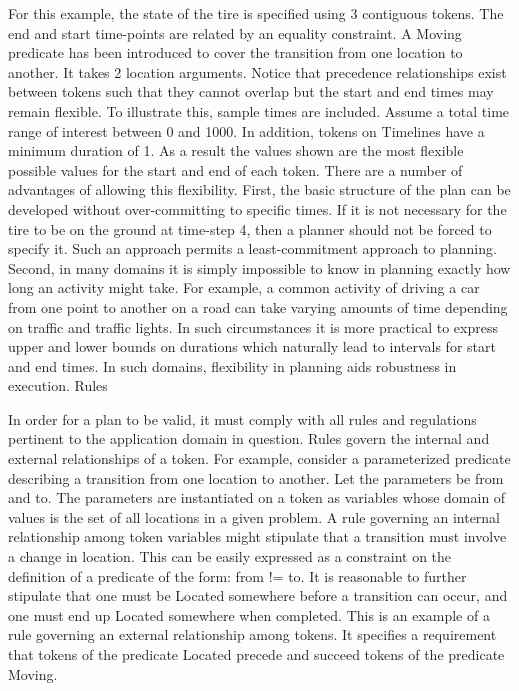 For this example, the state of the tire is specified using 3 contiguous tokens. The end and start time-points are related by an equality constraint. A Moving predicate has been introduced to cover the transition from one location to another. It takes 2 location arguments. Notice that precedence relationships exist between tokens such that they cannot overlap but the start and end times may remain flexible. To illustrate this, sample times are included. Assume a total time range of interest between 0 and 1000. In addition, tokens on Timelines have a minimum duration of 1. As a result the values shown are the most flexible possible values for the start and end of each token. There are a number of advantages of allowing this flexibility. First, the basic structure of the plan can be developed without over-committing to specific times. If it is not necessary for the tire to be on the ground at time-step 4, then a planner should not be forced to specify it. Such an approach permits a least-commitment approach to planning. Second, in many domains it is simply impossible to know in planning exactly how long an activity might take. For example, a common activity of driving a car from one point to another on a road can take varying amounts of time depending on traffic and traffic lights. In such circumstances it is more practical to express upper and lower bounds on durations which naturally lead to intervals for start and end times. In such domains, flexibility in planning aids robustness in execution.
Rules

In order for a plan to be valid, it must comply with all rules and regulations pertinent to the application domain in question. Rules govern the internal and external relationships of a token. For example, consider a parameterized predicate describing a transition from one location to another. Let the parameters be from and to. The parameters are instantiated on a token as variables whose domain of values is the set of all locations in a given problem. A rule governing an internal relationship among token variables might stipulate that a transition must involve a change in location. This can be easily expressed as a constraint on the definition of a predicate of the form: from != to. It is reasonable to further stipulate that one must be Located somewhere before a transition can occur, and one must end up Located somewhere when completed. This is an example of a rule governing an external relationship among tokens. It specifies a requirement that tokens of the predicate Located precede and succeed tokens of the predicate Moving.

